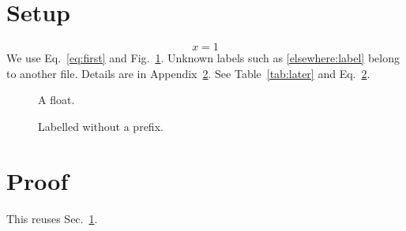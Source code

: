 \documentclass{article}
\begin{document}
\section{Setup}\label{sec:setup}
\begin{equation}\label{eq:first}
  x = 1
\end{equation}
We use Eq.~\eqref{eq:first} and Fig.~\ref{fig:later}.
Unknown labels such as \ref{elsewhere:label} belong to another file.
Details are in Appendix~\ref{app:proof}.
See Table~\ref{tab:later} and Eq.~\ref{eq:in-float}.
\begin{figure}
  \caption{A float.}\label{fig:later}
\end{figure}
\begin{table}
  \caption{A table.}\label{tab:later}
\end{table}
\begin{figure}
  \caption{Labelled without a prefix.}\label{eq:in-float}
\end{figure}
\appendix
\section{Proof}\label{app:proof}
This reuses Sec.~\ref{sec:setup}.
\end{document}
